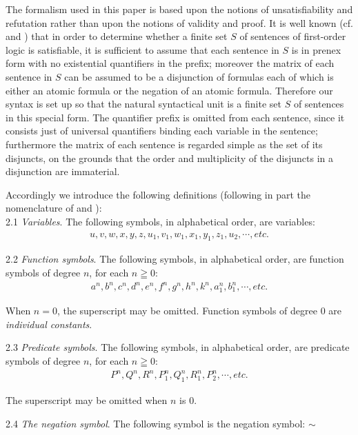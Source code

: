 \documentclass[8pt]{extarticle}
\begin{document}
The formalism used in this paper is based upon the notions of unsatisfiability and refutation rather than upon the notions of validity and proof. It is well known (cf. \cite{davis_1960} and \cite{robinson_1963}) that in order to determine whether a finite set $S$ of sentences of first-order logic is satisfiable, it is sufficient to assume that each sentence in $S$ is in prenex form with no existential quantifiers in the prefix; moreover the matrix of each sentence in $S$ can be assumed to be a disjunction of formulas each of which is either an atomic formula or the negation of an atomic formula. Therefore our syntax is set up so that the natural syntactical unit is a finite set $S$ of sentences in this special form. The quantifier prefix is omitted from each sentence, since it consists just of universal quantifiers binding each variable in the sentence; furthermore the matrix of each sentence is regarded simple as the set of its disjuncts, on the grounds that the order and multiplicity of the disjuncts in a disjunction are immaterial.

Accordingly we introduce the following definitions (following in part the nomenclature of \cite{davis_1960} and \cite{robinson_1963}):\\
2.1 \emph{Variables}. The following symbols, in alphabetical order, are variables:
\begin{align*}
    u, v, w, x, y, z, u_1 , v_1 , w_1 , x_1 , y_1 , z_1 , u_2 , \dotsm , etc.
\end{align*}
\newpage

2.2 \emph{Function symbols}. The following symbols, in alphabetical order, are function symbols of degree $n$, for each $n\geqq0$:
\begin{align*}
    a^n,b^n,c^n,d^n,e^n,f^n,g^n,h^n,k^n,a_1^n,b_1^n,\dotsm, etc.
\end{align*}

\noindent When $n = 0$, the superscript may be omitted. Function symbols of degree 0 are \emph{individual constants}.

2.3 \emph{Predicate symbols}. The following symbols, in alphabetical order, are predicate symbols of degree $n$, for each $n\geqq0$:
\begin{align*}
    P^n,Q^n,R^n,P_1^n,Q_1^n,R_1^n,P_2^n,\dotsm, etc.
\end{align*}

\noindent The superscript may be omitted when $n$ is 0.

2.4 \emph{The negation symbol}. The following symbol is the negation symbol: $\sim$
\end{document}
